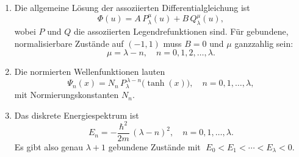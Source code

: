 \documentclass[a4paper,11pt]{article}
\begin{document}
\begin{enumerate}
  \item Die allgemeine Lösung der assoziierten Differentialgleichung ist
  \[
    \Phi(u)=A\,P_\lambda^{\mu}(u)+B\,Q_\lambda^{\mu}(u),
  \]
  wobei \(P\) und \(Q\) die assoziierten Legendre­funktionen sind. Für gebundene, normalisierbare Zustände auf \((-1,1)\) muss \(B=0\) und \(\mu\) ganzzahlig sein:
  \[
    \mu=\lambda-n,\quad n=0,1,2,\dots,\lambda.
  \]

  \item Die normierten Wellenfunktionen lauten
  \[
    \Psi_n(x)
    =N_n\,P_\lambda^{\,\lambda-n}\!\bigl(\tanh(x)\bigr),
    \quad n=0,1,\dots,\lambda,
  \]
  mit Normierungskonstanten \(N_n\).

  \item Das diskrete Energiespektrum ist
  \[
    E_n
    =-\frac{\hbar^2}{2m}\,(\lambda-n)^2,
    \quad n=0,1,\dots,\lambda.
  \]
  Es gibt also genau \(\lambda+1\) gebundene Zustände mit
  \(\;E_0< E_1<\cdots< E_{\lambda}<0\).
\end{enumerate}
\end{document}
